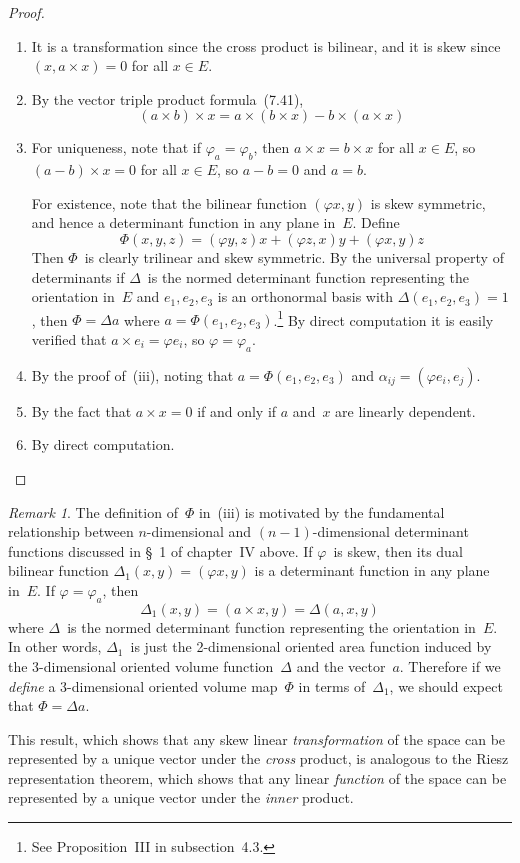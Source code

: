 \documentclass[letterpaper,12pt]{article}
\newcommand{\cross}{\times}
\newcommand{\iprod}[2]{(#1,#2)}
\theoremstyle{definition}
\theoremstyle{remark}
\newtheorem*{rmk}{Remark}
\begin{document}
\begin{proof}\
\begin{enumerate}
\item[(i)] It is a transformation since the cross product is bilinear, and it is skew since \(\iprod{x}{a\cross x}=0\) for all \(x\in E\).
\item[(ii)] By the vector triple product formula~(7.41),
\[(a\cross b)\cross x=a\cross(b\cross x)-b\cross(a\cross x)\]
\item[(iii)] For uniqueness, note that if \(\varphi_a=\varphi_b\), then \(a\cross x=b\cross x\) for all \(x\in E\), so \((a-b)\cross x=0\) for all \(x\in E\), so \(a-b=0\) and \(a=b\).

For existence, note that the bilinear function \(\iprod{\varphi x}{y}\) is skew symmetric, and hence a determinant function in any plane in~\(E\). Define
\[\Phi(x,y,z)=\iprod{\varphi y}{z}x+\iprod{\varphi z}{x}y+\iprod{\varphi x}{y}z\]
Then \(\Phi\)~is clearly trilinear and skew symmetric. By the universal property of determinants if \(\Delta\)~is the normed determinant function representing the orientation in~\(E\) and \(e_1,e_2,e_3\) is an orthonormal basis with \(\Delta(e_1,e_2,e_3)=1\), then \(\Phi=\Delta a\) where \(a=\Phi(e_1,e_2,e_3)\).\footnote{See Proposition~III in subsection~4.3.} By direct computation it is easily verified that \(a\cross e_i=\varphi e_i\), so \(\varphi=\varphi_a\).
\item[(iv)] By the proof of~(iii), noting that \(a=\Phi(e_1,e_2,e_3)\) and \(\alpha_{ij}=\iprod{\varphi e_i}{e_j}\).
\item[(v)] By the fact that \(a\cross x=0\) if and only if \(a\) and~\(x\) are linearly dependent.
\item[(vi)] By direct computation.\qedhere
\end{enumerate}
\end{proof}
\begin{rmk}
The definition of~\(\Phi\) in~(iii) is motivated by the fundamental relationship between \(n\)-dimensional and \((n-1)\)-dimensional determinant functions discussed in \S~1 of chapter~IV above. If \(\varphi\)~is skew, then its dual bilinear function \(\Delta_1(x,y)=\iprod{\varphi x}{y}\) is a determinant function in any plane in~\(E\). If \(\varphi=\varphi_a\), then
\[\Delta_1(x,y)=\iprod{a\cross x}{y}=\Delta(a,x,y)\]
where \(\Delta\)~is the normed determinant function representing the orientation in~\(E\). In other words, \(\Delta_1\)~is just the 2-dimensional oriented area function induced by the 3-dimensional oriented volume function~\(\Delta\) and the vector~\(a\). Therefore if we \emph{define} a 3-dimensional oriented volume map~\(\Phi\) in terms of~\(\Delta_1\), we should expect that \(\Phi=\Delta a\).

This result, which shows that any skew linear \emph{transformation} of the space can be represented by a unique vector under the \emph{cross} product, is analogous to the Riesz representation theorem, which shows that any linear \emph{function} of the space can be represented by a unique vector under the \emph{inner} product.
\end{rmk}
\end{document}
